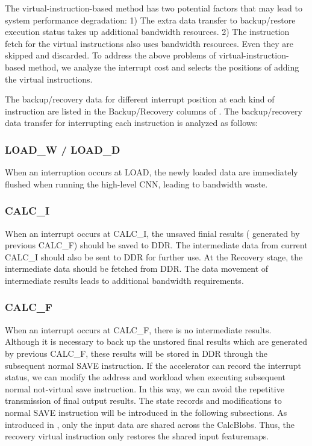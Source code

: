 The virtual-instruction-based method has two potential factors that may lead to system performance degradation: 1) The extra data transfer to backup/restore execution status takes up additional bandwidth resources. 2) The instruction fetch for the virtual instructions also uses bandwidth resources. Even they are skipped and discarded. To address the above problems of virtual-instruction-based method, we analyze the interrupt cost and selects the positions of adding the virtual instructions.

The backup/recovery data for different interrupt position at each kind of instruction are listed in the Backup/Recovery columns of . The backup/recovery data transfer for interrupting each instruction is analyzed as follows:

\subsubsection{LOAD\_W / LOAD\_D }
When an interruption occurs at LOAD, the newly loaded data are immediately flushed when running the high-level CNN, leading to bandwidth waste.

\subsubsection{CALC\_I} 
When an interrupt occurs at CALC\_I, the unsaved finial results ( generated by previous CALC\_F) should be saved to DDR. The intermediate data from current CALC\_I should also be sent to DDR for further use. At the Recovery stage, the intermediate data should be fetched from DDR. The data movement of intermediate results leads to additional bandwidth requirements.


\subsubsection{CALC\_F}
When an interrupt occurs at CALC\_F, there is no intermediate results. Although it is necessary to back up the unstored final results which are generated by previous CALC\_F, these results will be stored in DDR through the subsequent normal SAVE instruction.
If the accelerator can record the interrupt status, we can modify the address and workload when executing subsequent normal not-virtual save instruction.
In this way, we can avoid the repetitive transmission of final output results.
The state records and modifications to normal SAVE instruction will be introduced in the following subsections.
As introduced in , only the input data are shared across the CalcBlobs. Thus, the recovery virtual instruction only restores the shared input featuremaps.



